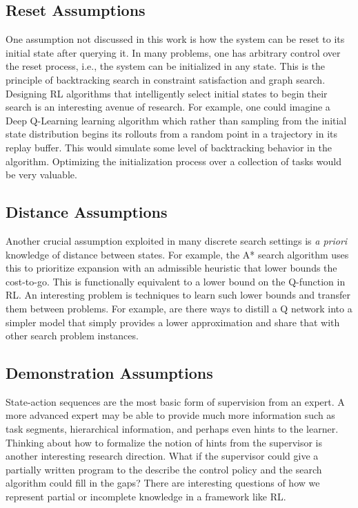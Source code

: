 \subsection*{Reset Assumptions}
One assumption not discussed in this work is how the system can be reset to its initial state after querying it. In many problems, one has arbitrary control over the reset process, i.e., the system can be initialized in any state.
This is the principle of backtracking search in constraint satisfaction and graph search. 
Designing RL algorithms that intelligently select initial states to begin their search is an interesting avenue of research.
For example, one could imagine a Deep Q-Learning learning algorithm which rather than sampling from the initial state distribution begins its rollouts from a random point in a trajectory in its replay buffer.
This would simulate some level of backtracking behavior in the algorithm.
Optimizing the initialization process over a collection of tasks would be very valuable.

\subsection*{Distance Assumptions}
Another crucial assumption exploited in many discrete search settings is \emph{a priori} knowledge of distance between states. For example, the A* search algorithm uses this to prioritize expansion with an admissible heuristic that lower bounds the cost-to-go.
This is functionally equivalent to a lower bound on the Q-function in RL.
An interesting problem is techniques to learn such lower bounds and transfer them between problems.
For example, are there ways to distill a Q network into a simpler model that simply provides a lower approximation and share that with other search problem instances.

\subsection*{Demonstration Assumptions}
State-action sequences are the most basic form of supervision from an expert. 
A more advanced expert may be able to provide much more information such as task segments, hierarchical information, and perhaps even hints to the learner. 
Thinking about how to formalize the notion of hints from the supervisor is another interesting research direction.
What if the supervisor could give a partially written program to the describe the control policy and the search algorithm could fill in the gaps?
There are interesting questions of how we represent partial or incomplete knowledge in a framework like RL.

